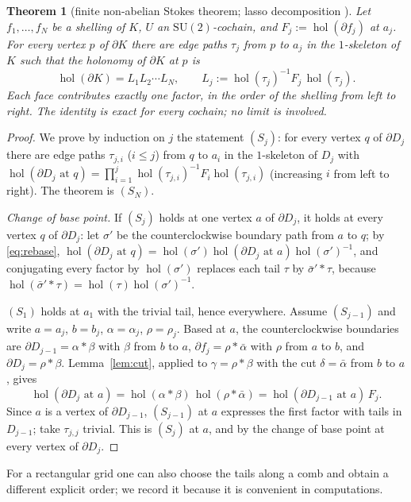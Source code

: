 \documentclass[11pt,reqno]{amsart}
\newtheorem{theorem}{Theorem}[section]
\theoremstyle{definition}
\theoremstyle{remark}
\numberwithin{equation}{section}
\newcommand{\SU}{\mathrm{SU}}
\newcommand{\hol}{\operatorname{hol}}
\begin{document}
\begin{theorem}[finite non-abelian Stokes theorem; lasso decomposition \cite{Arefeva,Bralic80,Levy03,Levy10}]\label{thm:stokes}
Let $f_1,\dots,f_N$ be a shelling of $K$, $U$ an $\SU(2)$-cochain, and $F_j:=\hol(\partial f_j)$ at $a_j$.  For every
vertex $p$ of $\partial K$ there are edge paths $\tau_j$ from $p$ to $a_j$ in the $1$-skeleton of $K$ such that the
holonomy of $\partial K$ at $p$ is
\[
\hol(\partial K)=L_1L_2\cdots L_N,\qquad L_j:=\hol(\tau_j)^{-1}F_j\,\hol(\tau_j).
\]
Each face contributes exactly one factor, in the order of the shelling from left to right.  The identity is
exact for every cochain; no limit is involved.
\end{theorem}
\begin{proof}
We prove by induction on $j$ the statement $(S_j)$: for every vertex $q$ of $\partial D_j$ there are edge paths
$\tau_{j,i}$ ($i\le j$) from $q$ to $a_i$ in the $1$-skeleton of $D_j$ with
$\hol(\partial D_j\text{ at }q)=\prod_{i=1}^{j}\hol(\tau_{j,i})^{-1}F_i\hol(\tau_{j,i})$ (increasing $i$ from left to
right).  The theorem is $(S_N)$.

\emph{Change of base point.}  If $(S_j)$ holds at one vertex $a$ of $\partial D_j$, it holds at every vertex $q$ of
$\partial D_j$: let $\sigma'$ be the counterclockwise boundary path from $a$ to $q$; by \eqref{eq:rebase},
$\hol(\partial D_j\text{ at }q)=\hol(\sigma')\hol(\partial D_j\text{ at }a)\hol(\sigma')^{-1}$, and conjugating every
factor by $\hol(\sigma')$ replaces each tail $\tau$ by $\bar\sigma'*\tau$, because
$\hol(\bar\sigma'*\tau)=\hol(\tau)\hol(\sigma')^{-1}$.

$(S_1)$ holds at $a_1$ with the trivial tail, hence everywhere.  Assume $(S_{j-1})$ and write $a=a_j$,
$b=b_j$, $\alpha=\alpha_j$, $\rho=\rho_j$.  Based at $a$, the counterclockwise boundaries are
$\partial D_{j-1}=\alpha*\beta$ with $\beta$ from $b$ to $a$, $\partial f_j=\rho*\bar\alpha$ with $\rho$ from $a$ to $b$,
and $\partial D_j=\rho*\beta$.  Lemma~\ref{lem:cut}, applied to $\gamma=\rho*\beta$ with the cut $\delta=\bar\alpha$
from $b$ to $a$, gives
\[
\hol(\partial D_j\text{ at }a)=\hol(\alpha*\beta)\,\hol(\rho*\bar\alpha)=\hol(\partial D_{j-1}\text{ at }a)\,F_j .
\]
Since $a$ is a vertex of $\partial D_{j-1}$, $(S_{j-1})$ at $a$ expresses the first factor with tails in $D_{j-1}$;
take $\tau_{j,j}$ trivial.  This is $(S_j)$ at $a$, and by the change of base point at every vertex of $\partial D_j$.
\end{proof}

For a rectangular grid one can also choose the tails along a comb and obtain a different explicit order; we
record it because it is convenient in computations.
\end{document}
